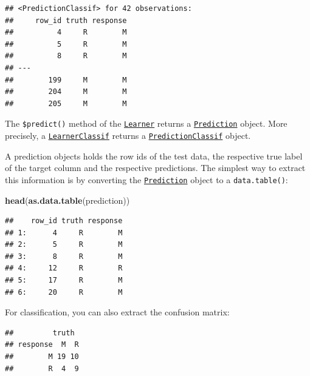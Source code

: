 \documentclass[]{scrbook}
\newenvironment{Shaded}{\begin{snugshade}}{\end{snugshade}}
\newcommand{\KeywordTok}[1]{\textcolor[rgb]{0.13,0.29,0.53}{\textbf{#1}}}
\newcommand{\NormalTok}[1]{#1}
\newcommand{\OperatorTok}[1]{\textcolor[rgb]{0.81,0.36,0.00}{\textbf{#1}}}
\renewenvironment{Shaded} {\begin{snugshade}\small} {\end{snugshade}}
\begin{document}
\begin{verbatim}
## <PredictionClassif> for 42 observations:
##     row_id truth response
##          4     R        M
##          5     R        M
##          8     R        M
## ---                      
##        199     M        M
##        204     M        M
##        205     M        M
\end{verbatim}

The \texttt{\$predict()} method of the \href{https://mlr3.mlr-org.com/reference/Learner.html}{\texttt{Learner}} returns a \href{https://mlr3.mlr-org.com/reference/Prediction.html}{\texttt{Prediction}} object.
More precisely, a \href{https://mlr3.mlr-org.com/reference/LearnerClassif.html}{\texttt{LearnerClassif}} returns a \href{https://mlr3.mlr-org.com/reference/PredictionClassif.html}{\texttt{PredictionClassif}} object.

A prediction objects holds the row ids of the test data, the respective true label of the target column and the respective predictions.
The simplest way to extract this information is by converting the \href{https://mlr3.mlr-org.com/reference/Prediction.html}{\texttt{Prediction}} object to a \texttt{data.table()}:

\begin{Shaded}
\begin{Highlighting}[]
\KeywordTok{head}\NormalTok{(}\KeywordTok{as.data.table}\NormalTok{(prediction))}
\end{Highlighting}
\end{Shaded}

\begin{verbatim}
##    row_id truth response
## 1:      4     R        M
## 2:      5     R        M
## 3:      8     R        M
## 4:     12     R        R
## 5:     17     R        M
## 6:     20     R        M
\end{verbatim}

For classification, you can also extract the confusion matrix:

\begin{Shaded}
\end{Shaded}

\begin{verbatim}
##         truth
## response  M  R
##        M 19 10
##        R  4  9
\end{verbatim}
\end{document}
